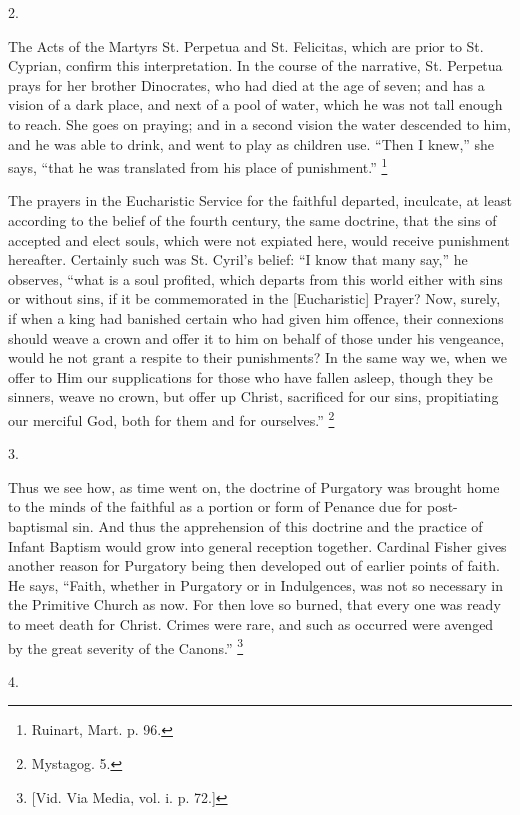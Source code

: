 2.

The Acts of the Martyrs St. Perpetua and St. Felicitas, which are
prior to St. Cyprian, confirm this interpretation. In the course of
the narrative, St. Perpetua prays for her brother Dinocrates, who had
died at the age of seven; and has a vision of a dark place, and next
of a pool of water, which he was not tall enough to reach. She goes on
praying; and in a second vision the water descended to him, and he was
able to drink, and went to play as children use. ``Then I
knew,'' she says, ``that he was translated from his place of
punishment.'' \footnote{Ruinart, Mart. p. 96.}

The prayers in the Eucharistic Service for the faithful departed,
inculcate, at least according to the belief of the fourth century, the
same doctrine, that the sins of accepted and elect souls, which were
not expiated here, would receive punishment hereafter. Certainly such
was St. Cyril's belief: ``I know that many say,'' he observes,
``what is a soul profited, which departs from this world either
with sins or without sins, if it be commemorated in the [Eucharistic]
Prayer? Now, surely, if when a king had banished certain who had given
him offence, their connexions should weave a crown and offer it to him
on behalf of those under his vengeance, would he not grant a respite
to their punishments? In the same way we, when we offer to Him our
supplications for those who have fallen asleep, though they be
sinners, weave no crown, but offer up Christ, sacrificed for our sins,
propitiating our merciful God, both for them and for ourselves.''
\footnote{Mystagog. 5.}

3.

Thus we see how, as time went on, the doctrine of Purgatory was
brought home to the minds of the faithful as a portion or form of
Penance due for post-baptismal sin. And thus the apprehension of this
doctrine and the practice of Infant Baptism would grow into general
reception together. Cardinal Fisher gives another reason for Purgatory
being then developed out of earlier points of faith. He says,
``Faith, whether in Purgatory or in Indulgences, was not so
necessary in the Primitive Church as now. For then love so burned,
that every one was ready to meet death for Christ. Crimes were rare,
and such as occurred were avenged by the great severity of the
Canons.'' \footnote{[Vid. Via
Media, vol. i. p. 72.]}

4.

